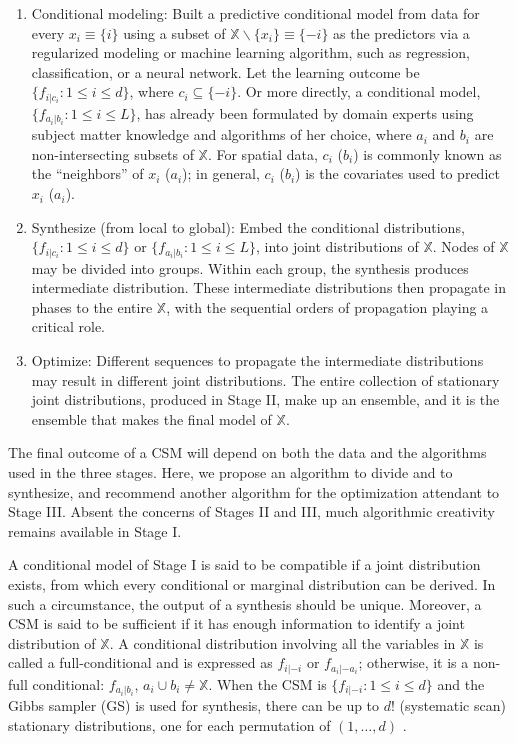 \documentclass[12pt,a4paper]{article}
\begin{document}
\begin{enumerate}[\sf {Stage} I.]
\item Conditional modeling: Built a predictive conditional model from data for every $x_i \equiv \{i\}$ using a subset of $\mathbb{X} \backslash \{x_i\}\equiv \{-i\}$ as the predictors via a regularized modeling or machine learning algorithm, such as regression, classification, or a neural network.  Let the learning outcome be $\{f_{i|c_i}: 1 \le i \le d\}$,  where $c_i \subseteq \{-i\}$.  Or more directly, a conditional model, $\{ f_{a_i|b_i}: 1 \le i \le L \}$, has already been formulated by domain experts using subject matter knowledge and algorithms of her choice, where $a_i$ and $b_i$ are non-intersecting subsets of $\mathbb{X}$.
    For spatial data, $c_i$ ($b_i$) is commonly known as the ``neighbors'' of $x_i$ ($a_i$); in general, $c_i$ ($b_i$) is the covariates used to predict $x_i$ ($a_i$).
\item Synthesize (from local to global): Embed the conditional distributions, $\{f_{i|c_i}: 1 \le i \le d\}$ or $\{f_{a_i|b_i}: 1 \le i \le L \}$, into joint distributions of $\mathbb{X}$. Nodes of $\mathbb{X}$ may be divided into groups.   Within each group, the synthesis  produces intermediate distribution.  These intermediate distributions then propagate in phases to the entire $\mathbb{X}$, with the sequential orders of propagation playing  a critical role.  %
\item Optimize: Different sequences to propagate the intermediate distributions may result in different joint distributions.  The entire collection of  stationary joint distributions, produced in {\sf Stage II}, make up an ensemble, and it is the ensemble that makes the final model of $\mathbb{X}$.

\end{enumerate}
The final outcome of a CSM will depend on both the data and the algorithms used in the three stages.  Here, we propose an algorithm to divide and to synthesize, and recommend another algorithm for the optimization attendant to {\sf Stage III}. Absent the concerns of {\sf Stages II} and {\sf III}, much algorithmic creativity remains available in {\sf Stage I}.

A conditional model of {\sf Stage I} is said to be compatible if  a joint distribution exists, from which  every conditional or marginal distribution can be derived.  In such a circumstance, the output of a synthesis should be unique.  Moreover, a CSM is said to be sufficient if it has enough information to identify a joint distribution of $\mathbb{X}$.
A conditional distribution involving all the variables in $\mathbb{X}$ is called  a full-conditional and is expressed as $f_{i|-i}$ or $f_{a_i|-a_i}$;
otherwise, it is a non-full conditional: $f_{a_i|b_i}$, $a_i\cup b_i \ne \mathbb{X}$. When the CSM is $\{f_{i|-i}: 1 \le i \le d\}$ and the Gibbs sampler (GS) is used for synthesis, there can be up to $d!$ (systematic scan) stationary distributions, one for each permutation of $(1,\ldots,d)$ \citep{Chen2015}.
\end{document}
